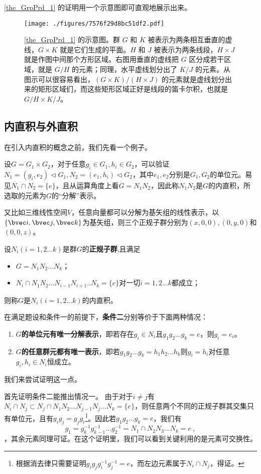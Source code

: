 \autoref{the_GrpPrd_1} 的证明用一个示意图即可直观地展示出来。

\begin{figure}[ht]
\centering
\texttt{[image: ./figures/7576f29d8bc51df2.pdf]}
\caption{\autoref{the_GrpPrd_1} 的示意图。群 $G$ 和 $K$ 被表示为两条相互垂直的虚线，$G\times K$ 就是它们生成的平面。$H$ 和 $J$ 被表示为两条线段，$H\times J$ 就是作图中间那个方形区域。右图用垂直的虚线把 $G$ 区分成若干区域，就是 $G/H$ 的元素；同理，水平虚线划分出了 $K/J$ 的元素。从图示可以很容易看出，$(G\times K)/(H\times J)$ 的元素就是虚线划分出来的矩形区域们，而这些矩形区域正好是线段的笛卡尔积，也就是 $G/H\times K/J$。} \label{fig_GrpPrd_1}
\end{figure}
\subsection{内直积与外直积}
在引入内直积的概念之前，我们先看一个例子。

设$G=G_1\times G_2$，对于任意$g_i\in G_1,h_i\in G_2$，可以验证$N_1=(g_i,e_2)\vartriangleleft G_1,N_2=(e_1,h_i)\vartriangleleft G_2$，其中$e_1,e_2$分别是$G_1,G_2$的单位元。易见$N_1\cap N_2=\{e\}$，且从运算角度上看$G=N_1N_2$，因此称$N_1N_2$是$G$的内直积，所选取的元素为$G$的“分解”表示。

又比如三维线性空间$V$，任意向量都可以分解为基矢组的线性表示，以$\{\bvec i,\bvec j,\bvec k\}$为基矢组，则三个正规子群分别为$(x,0,0),(0,y,0)$和$(0,0,z)$。
\begin{definition}{}
设$N_i(i=1,2...k)$是群$G$的\textbf{正规子群},且满足
\begin{itemize}
\item $G=N_1N_2...N_k$；
\item $N_i\cap N_1N_2...N_{i-1}N_{i+1}..N_k=\{e\}$对一切$i=1,2...k$都成立；
\end{itemize}
则称$G$是$N_i(i=1,2...k)$的内直积。
\end{definition}
在满足题设和条件一的前提下，\textbf{条件二}分别等价于下面两种情况：
\begin{enumerate}
\item \textbf{$G$的单位元有唯一分解表示}，即若存在$g_i\in N_i$且$g_1g_2...g_k=e$，则$g_i=e_i$。
\item \textbf{$G$的任意群元都有唯一表示}，即若$g_1g_2...g_k=h_1h_2...h_k$则$g_i=h_i$对任意$g_i,h_i\in N_i$恒成立。
\end{enumerate}
我们来尝试证明这一点。

首先证明条件二能推出情况一。
由于对于$i\neq j$有$N_i\cap N_j\subset N_j\cap N_1N_2...N_{j-1}N_j...N_k=\{e\}$，则任意两个不同的正规子群其交集只有单位元，且有$g_ig_j=g_jg_i$\footnote{根据消去律只需要证明$g_ig_jg_i^{-1}g_j^{-1}=e$，而左边元素属于$N_i\cap N_j$，得证。}。因此若$g_1g_2...g_k=e$，我们有
\begin{equation}
g_1=g_k^{-1}g_{k-1}^{-1}...g_2^{-1}=N_1\cap N_2N_3...N_k=e~,
\end{equation}
，其余元素同理可证。在这个证明里，我们可以看到关键利用的是元素可交换性。

